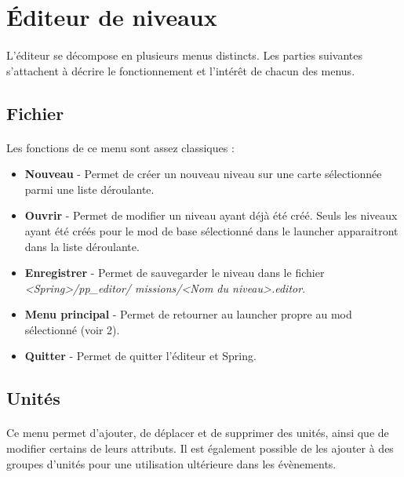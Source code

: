 \documentclass[a4paper]{article}
\begin{document}
\section{Éditeur de niveaux}
\paragraph{ }
L'éditeur se décompose en plusieurs menus distincts. Les parties suivantes s'attachent à décrire le fonctionnement et l'intérêt de chacun des menus.
\subsection{Fichier}
\paragraph{ }
Les fonctions de ce menu sont assez classiques :
\begin{itemize}
\item \textbf{Nouveau} - Permet de créer un nouveau niveau sur une carte sélectionnée parmi une liste déroulante.
\item \textbf{Ouvrir} - Permet de modifier un niveau ayant déjà été créé. Seuls les niveaux ayant été créés pour le mod de base sélectionné dans le launcher apparaitront dans la liste déroulante.
\item \textbf{Enregistrer} - Permet de sauvegarder le niveau dans le fichier \textit{<Spring>/pp\_editor/ missions/<Nom du niveau>.editor}.
\item \textbf{Menu principal} - Permet de retourner au launcher propre au mod sélectionné (voir 2).
\item \textbf{Quitter} - Permet de quitter l'éditeur et Spring.
\end{itemize}
\subsection{Unités}
\paragraph{ }
Ce menu permet d'ajouter, de déplacer et de supprimer des unités, ainsi que de modifier certains de leurs attributs. Il est également possible de les ajouter à des groupes d'unités pour une utilisation ultérieure dans les évènements.
\end{document}
